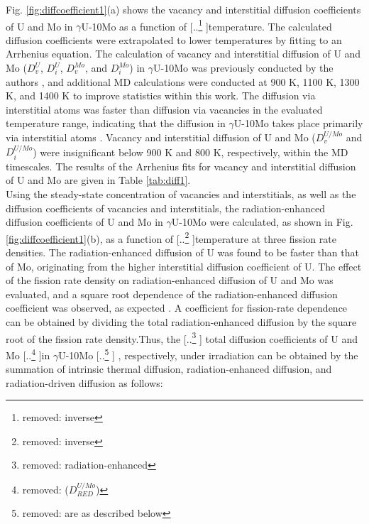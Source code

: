 \documentclass[preprint,12pt]{elsarticle}
\providecommand{\DIFadd}[1]{{\protect\color{blue} \sf #1}} %
\providecommand{\DIFdel}[1]{{\protect\color{red} [..\footnote{removed: #1} ]}} %
\providecommand{\DIFaddbegin}{} %
\providecommand{\DIFaddend}{} %
\providecommand{\DIFdelbegin}{} %
\providecommand{\DIFdelend}{} %
\newcommand{\DIFscaledelfig}{0.5}
\newlength{\DIFdelgraphicswidth} %
\newlength{\DIFdelgraphicsheight} %
\newcommand{\DIFaddincludegraphics}[2][]{{\color{blue}\fbox{\DIFOincludegraphics[#1]{#2}}}} %
\newcommand{\DIFdelincludegraphics}[2][]{%
\sbox{\DIFdelgraphicsbox}{\DIFOincludegraphics[#1]{#2}}%
\settoboxwidth{\DIFdelgraphicswidth}{\DIFdelgraphicsbox} %
\settoboxtotalheight{\DIFdelgraphicsheight}{\DIFdelgraphicsbox} %
\scalebox{\DIFscaledelfig}{%
\parbox[b]{\DIFdelgraphicswidth}{\usebox{\DIFdelgraphicsbox}\\[-\baselineskip] \rule{\DIFdelgraphicswidth}{0em}}\llap{\resizebox{\DIFdelgraphicswidth}{\DIFdelgraphicsheight}{%
\setlength{\unitlength}{\DIFdelgraphicswidth}%
\begin{picture}(1,1)%
\thicklines\linethickness{2pt} %
{\color[rgb]{1,0,0}\put(0,0){\framebox(1,1){}}}%
{\color[rgb]{1,0,0}\put(0,0){\line( 1,1){1}}}%
{\color[rgb]{1,0,0}\put(0,1){\line(1,-1){1}}}%
\end{picture}%
}\hspace*{3pt}}} %
} %
\DeclareRobustCommand{\DIFaddbegin}{\DIFOaddbegin \let\includegraphics\DIFaddincludegraphics} %
\DeclareRobustCommand{\DIFaddend}{\DIFOaddend \let\includegraphics\DIFOincludegraphics} %
\DeclareRobustCommand{\DIFdelbegin}{\DIFOdelbegin \let\includegraphics\DIFdelincludegraphics} %
\DeclareRobustCommand{\DIFdelend}{\DIFOaddend \let\includegraphics\DIFOincludegraphics} %
\begin{document}
\indent Fig. \ref{fig:diffcoefficient1}(a) shows the vacancy and interstitial diffusion coefficients of U and Mo in $\gamma$U-10Mo as a function of \DIFdelbegin \DIFdel{inverse }\DIFdelend temperature. The calculated diffusion coefficients were extrapolated to lower temperatures by fitting to an Arrhenius equation. The calculation of vacancy and interstitial diffusion of U and Mo ($D^{U}_{v}$, $D^{U}_{i}$, $D^{Mo}_{v}$, and $D^{Mo}_{i}$) in $\gamma$U-10Mo was previously conducted by the authors \cite{park2021atomistic}, and additional MD calculations were conducted at 900 K, 1100 K, 1300 K, and 1400 K to improve statistics within this work. The diffusion via interstitial atoms was faster than diffusion via vacancies in the evaluated temperature range, indicating that the diffusion in $\gamma$U-10Mo takes place primarily via interstitial atoms \cite{park2021atomistic, smirnova2015atomistic}. Vacancy and interstitial diffusion of U and Mo ($D^{U/Mo}_{v}$ and $D^{U/Mo}_{i}$) were insignificant below 900 K and 800 K, respectively, within the MD timescales. The results of the Arrhenius fits for vacancy and interstitial diffusion of U and Mo are given in Table \ref{tab:diff1}.\\
\indent Using the steady-state concentration of vacancies and interstitials, as well as the diffusion coefficients of vacancies and interstitials, the radiation-enhanced diffusion coefficients of U and Mo in $\gamma$U-10Mo were calculated, as shown in Fig. \ref{fig:diffcoefficient1}(b), as a function of \DIFdelbegin \DIFdel{inverse }\DIFdelend temperature at three fission rate densities. The radiation-enhanced diffusion of U was found to be faster than that of Mo, originating from the higher interstitial diffusion coefficient of U. The effect of the fission rate density on radiation-enhanced diffusion of U and Mo was evaluated, and a square root dependence of the radiation-enhanced diffusion coefficient was observed, as expected \cite{cooper2021irradiation, matthews2020cluster}. A coefficient for fission-rate dependence can be obtained by dividing the total radiation-enhanced diffusion by the square root of the fission rate density.Thus, the \DIFdelbegin \DIFdel{radiation-enhanced }\DIFdelend \DIFaddbegin \DIFadd{total }\DIFaddend diffusion coefficients of U and Mo \DIFdelbegin \DIFdel{($D_{RED}^{U/Mo}$) }\DIFdelend in $\gamma$U-10Mo\DIFdelbegin \DIFdel{are as described below}\DIFdelend \DIFaddbegin \DIFadd{, respectively, under irradiation can be obtained by the summation of intrinsic thermal diffusion, radiation-enhanced diffusion, and radiation-driven diffusion as follows}\DIFaddend :
\\
\end{document}
